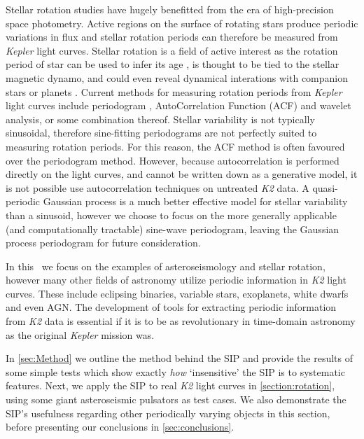 \documentclass[useAMS, usenatbib, preprint, 12pt]{aastex}
\begin{document}
Stellar rotation studies have hugely benefitted from the era of high-precision
space photometry.
Active regions on the surface of rotating stars produce periodic variations
in flux and stellar rotation periods can therefore be measured from
{\it Kepler} light curves.
Stellar rotation is a field of active interest as the rotation period of star
can be used to infer its age \citep{Skumanich1972, Barnes2007, Epstein2014},
is thought to be tied to the stellar magnetic dynamo, and could even reveal
dynamical interations with companion stars or planets \citep[e.g.][]{Beky2014,
Poppenhaeger2014}.
Current methods for measuring rotation periods from {\it Kepler} light curves
include periodogram \citep[e.g.][]{Reinhold2013}, AutoCorrelation Function
(ACF) \citep{McQuillan2013} and wavelet \citep[e.g.][]{Garcia2014} analysis,
or some combination thereof.
Stellar variability is not typically sinusoidal, therefore sine-fitting
periodograms are not perfectly suited to measuring rotation periods.
For this reason, the ACF method is often favoured over the periodogram method.
However, because autocorrelation is performed directly on the light curves,
and cannot be written down as a generative model, it is not possible use
autocorrelation techniques on untreated {\it K2} data.
A quasi-periodic Gaussian process is a much better effective model for stellar
variability than a sinusoid, however we choose to focus on the more generally
applicable (and computationally tractable) sine-wave periodogram, leaving the
Gaussian process periodogram for future consideration.

In this \article\ we focus on the examples of asteroseismology and stellar
rotation, however many other fields of astronomy utilize periodic information
in {\it K2} light curves.
These include eclipsing binaries, variable stars, exoplanets, white dwarfs and
even AGN.
The development of tools for extracting periodic information from {\it K2}
data is essential if it is to be as revolutionary in time-domain
astronomy as the original {\it Kepler} mission was.

In \textsection\ref{sec:Method} we outline the method behind the SIP and
provide the results of some simple tests which show exactly {\it how}
`insensitive' the SIP is to systematic features.
Next, we apply the SIP to real {\it K2} light curves in
\textsection\ref{section:rotation}, using some giant asteroseismic pulsators as
test cases.
We also demonstrate the SIP's usefulness regarding other periodically varying
objects in this section, before presenting our conclusions in
\textsection\ref{sec:conclusions}.
\end{document}
